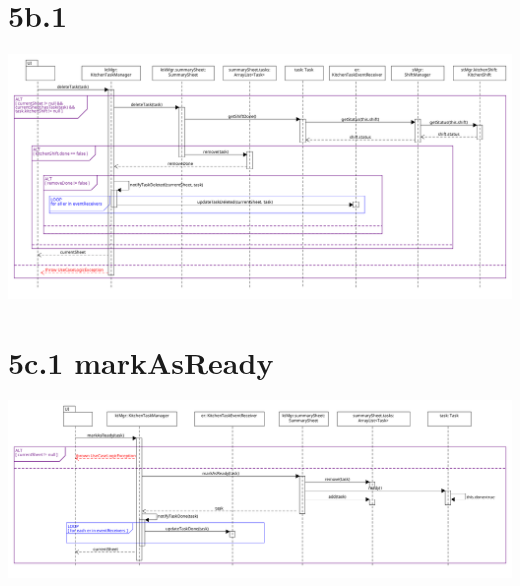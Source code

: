 \pagebreak

\section*{5b.1}

\begin{center}
  \includegraphics[scale = 0.25]{images/DSD/DSD 5b.png}
\end{center}

\pagebreak\section*{5c.1 markAsReady}

\begin{center}
  \includegraphics[scale = 0.27]{images/DSD/DSD 5c.png}
\end{center}

\pagebreak
